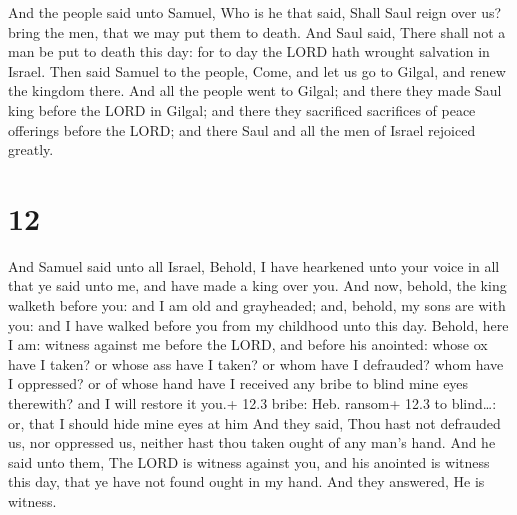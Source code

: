  And the people said unto Samuel, Who is he that said,
Shall Saul reign over us? bring the men, that we may put them to death.
 And Saul said, There shall not a man be put to death this
day: for to day the LORD hath wrought salvation in Israel. 
Then said Samuel to the people, Come, and let us go to Gilgal, and renew
the kingdom there.  And all the people went to Gilgal; and
there they made Saul king before the LORD in Gilgal; and there they
sacrificed sacrifices of peace offerings before the LORD; and there Saul
and all the men of Israel rejoiced greatly.

\hypertarget{section-11}{%
\section{12}\label{section-11}}

 And Samuel said unto all Israel, Behold, I have hearkened
unto your voice in all that ye said unto me, and have made a king over
you.  And now, behold, the king walketh before you: and I am
old and grayheaded; and, behold, my sons are with you: and I have walked
before you from my childhood unto this day.  Behold, here I
am: witness against me before the LORD, and before his anointed: whose
ox have I taken? or whose ass have I taken? or whom have I defrauded?
whom have I oppressed? or of whose hand have I received any bribe to
blind mine eyes therewith? and I will restore it you.+ 12.3 bribe: Heb.
ransom+ 12.3 to blind\ldots: or, that I should hide mine eyes at him
 And they said, Thou hast not defrauded us, nor oppressed
us, neither hast thou taken ought of any man's hand.  And he
said unto them, The LORD is witness against you, and his anointed is
witness this day, that ye have not found ought in my hand. And they
answered, He is witness.

